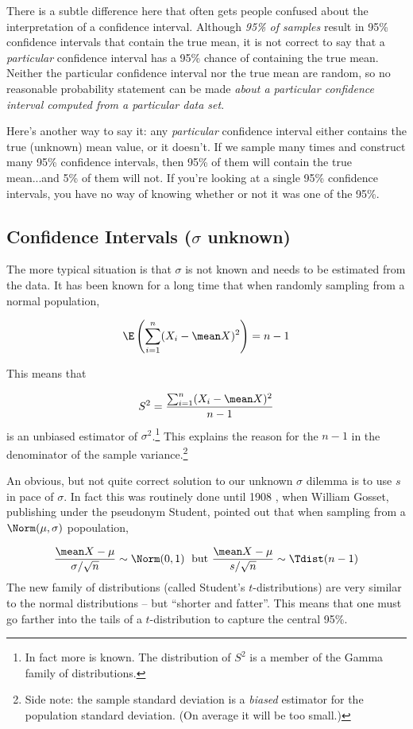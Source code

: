 \documentclass[twoside]{book}\usepackage[]{graphicx}\usepackage[]{xcolor}
\begin{document}
There is a subtle difference here that often gets people confused about the interpretation
of a confidence interval.  Although \emph{95\% of samples} result in 95\% confidence
intervals that contain the true mean, it is not correct to say that a \emph{particular} 
confidence interval has a 95\% chance of containing the true mean.  Neither the 
particular confidence interval nor the true mean are random, so no reasonable
probability statement can be made \emph{about a particular confidence interval
computed from a particular data set}.  

Here's another way to say it: any \emph{particular} confidence interval either contains the true (unknown) mean value, or it doesn't. If we sample many times and construct many 95\% confidence intervals, then 95\% of them will contain the true mean...and 5\% of them will not.  If you're looking at a single 95\% confidence intervals, you have no way of knowing whether or not it was one of the 95\%.

\subsection{Confidence Intervals ($\sigma$ unknown)}

The more typical situation is that $\sigma$ is not known and needs to be estimated 
from the data.  It has been known for a long time that when randomly sampling 
from a normal population,

\[
\E\left( \sum_{i=1}^n (X_i - \mean X)^2 \right) = n-1
\]

This means that 

\[
S^2 = \frac{ \sum_{i=1}^n (X_i - \mean X)^2 }{n-1}
\]
is an unbiased estimator of $\sigma^2$.\footnote{In fact more is known.  The
distribution of $S^2$ is a member of the Gamma family of distributions.} This
explains the reason for the $n-1$ in the denominator of the sample
variance.\footnote{Side note: the sample standard deviation is a \emph{biased}
estimator for the population standard deviation.  (On average it will be too
small.)}

An obvious, but not quite correct solution to our unknown $\sigma$ dilemma is to use
$s$ in pace of $\sigma$.  In fact this was routinely done until 1908 
\cite{Student1908}, 
when William Gosset, publishing under the pseudonym Student, pointed out that 
when sampling from a $\Norm(\mu, \sigma)$ popoulation,

\[
\frac{ \mean X - \mu}{\sigma/\sqrt{n}} \sim \Norm(0,1)
\mbox{\;\ but\ } 
\frac{ \mean X - \mu}{s/\sqrt{n}} \sim \Tdist(n-1)
\]
The new family of distributions (called Student's $t$-distributions) are very 
similar to the normal distributions -- but ``shorter and fatter''.  This means that
one must go farther into the tails of a $t$-distribution to capture the central 95\%.
\end{document}
